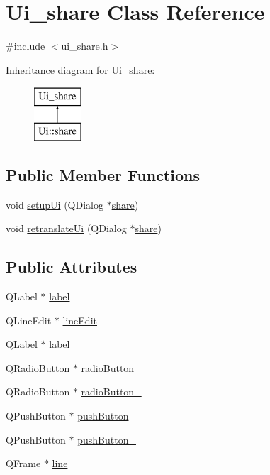 \hypertarget{classUi__share}{\section{Ui\-\_\-share Class Reference}
\label{classUi__share}
}


{\ttfamily \#include $<$ui\-\_\-share.\-h$>$}

Inheritance diagram for Ui\-\_\-share\-:\begin{figure}[H]
\begin{center}
\leavevmode
\includegraphics[height=2.000000cm]{classUi__share}
\end{center}
\end{figure}
\subsection*{Public Member Functions}
\begin{DoxyCompactItemize}
\item 
void \hyperlink{classUi__share_a36afe9952a93d4bd140b9f5619c9039d}{setup\-Ui} (Q\-Dialog $\ast$\hyperlink{classshare}{share})
\item 
void \hyperlink{classUi__share_a5cf130ea69ff2fe3672781b8e1bdad43}{retranslate\-Ui} (Q\-Dialog $\ast$\hyperlink{classshare}{share})
\end{DoxyCompactItemize}
\subsection*{Public Attributes}
\begin{DoxyCompactItemize}
\item 
Q\-Label $\ast$ \hyperlink{classUi__share_a0f9cf6700cc03d94e92184ec00d6d779}{label}
\item 
Q\-Line\-Edit $\ast$ \hyperlink{classUi__share_a9ac12497ba78acac793f9f7bbad0d7d8}{line\-Edit}
\item 
Q\-Label $\ast$ \hyperlink{classUi__share_adc2e30dbe8a3a183ad5f36572ebd34ce}{label\-\_}
\item 
Q\-Radio\-Button $\ast$ \hyperlink{classUi__share_aeed2476988d49d33cf654c1f44d55a25}{radio\-Button}
\item 
Q\-Radio\-Button $\ast$ \hyperlink{classUi__share_a8fe0bb6558878d6ed72a76cc287a241d}{radio\-Button\-\_}
\item 
Q\-Push\-Button $\ast$ \hyperlink{classUi__share_ad2a9acf7a35cdbebe7ed5e3a74dcf537}{push\-Button}
\item 
Q\-Push\-Button $\ast$ \hyperlink{classUi__share_aaf953bec7a13c73caccdc827d9dd168b}{push\-Button\-\_}
\item 
Q\-Frame $\ast$ \hyperlink{classUi__share_a4a05f72319c50150af03019e85b5e7d8}{line}
\end{DoxyCompactItemize}


